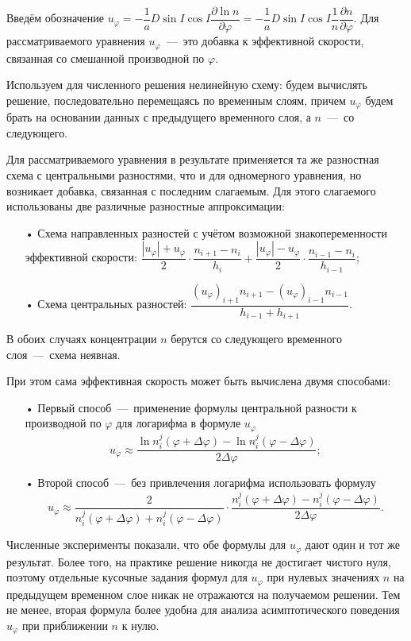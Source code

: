 \documentclass[14pt, a4paper, fleqn]{extarticle}
\begin{document}
Введём обозначение $u_\varphi=-\dfrac{1}{a}D\sin I \cos I\dfrac{\partial \ln n}{\partial \varphi}=-\dfrac{1}{a}D\sin I \cos I\dfrac{1}{n}\dfrac{\partial n}{\partial \varphi}.$ Для рассматриваемого уравнения $u_\varphi$~---~это добавка к эффективной скорости, связанная со смешанной производной по $\varphi$.

Используем для численного решения нелинейную схему: будем вычислять решение, последовательно перемещаясь по временным слоям, причем $u_\varphi$ будем брать на основании данных с предыдущего временного слоя, а $n$~---~со следующего.

Для рассматриваемого уравнения в результате применяется та же разностная схема с центральными разностями, что и для одномерного уравнения, но возникает добавка, связанная с последним слагаемым. Для этого слагаемого использованы две различные разностные аппроксимации:
\begin{itemize}
\item[•] Схема направленных разностей с учётом возможной знакопеременности эффективной скорости: $\dfrac{|u_\varphi|+u_\varphi}{2}\cdot\dfrac{n_{i+1}-n_i}{h_i} + \dfrac{|u_\varphi|-u_\varphi}{2}\cdot\dfrac{n_{i-1}-n_i}{h_{i-1}}$;
\item[•] Схема центральных разностей: $\dfrac{(u_\varphi)_{i+1}n_{i+1}-(u_\varphi)_{i-1}n_{i-1}}{h_{i-1}+h_{i+1}}$.
\end{itemize}
В обоих случаях концентрации $n$ берутся со следующего временного слоя~---~схема неявная.

\smallskip

При этом сама эффективная скорость может быть вычислена двумя способами: 
\begin{itemize}
\item[•] Первый способ~---~применение формулы центральной разности к производной по $\varphi$ для логарифма в формуле $u_\varphi$ $$u_\varphi\approx \dfrac{\ln n^j_i(\varphi+\Delta\varphi)-\ln n^j_i(\varphi-\Delta\varphi)}{2\Delta\varphi};$$ 
\item[•] Второй способ~---~без привлечения логарифма использовать формулу $$u_\varphi \approx \dfrac{2}{n_i^j(\varphi+\Delta\varphi)+n_i^j(\varphi-\Delta\varphi)}\cdot\dfrac{n_i^j(\varphi+\Delta\varphi)-n_i^j(\varphi-\Delta\varphi)}{2\Delta\varphi}.$$
\end{itemize}

Численные эксперименты показали, что обе формулы для $u_\varphi$ дают один и тот же результат. Более того, на практике решение никогда не достигает чистого нуля, поэтому отдельные кусочные задания формул для $u_\varphi$ при нулевых значениях $n$ на предыдущем временном слое никак не отражаются на получаемом решении. Тем не менее, вторая формула более удобна для анализа асимптотического поведения $u_\varphi$ при приближении $n$ к нулю.
\end{document}
